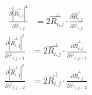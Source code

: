 \documentclass{article}
\renewcommand{\ij}{_{i,j}}
\newcommand{\ijj}{_{i,j-1}}
\newcommand{\ijjj}{_{i,j-2}}
\newcommand{\magn}[1]{\left\vert #1 \right\vert }
\renewcommand{\part}[2]{\frac{\partial #1 }{\partial #2}}
\newcommand{\partbig}[2]{\frac{\partial }{\partial #2}\left( #1 \right)}
\newcommand{\harp}{\overset{\rightharpoonup}}
\newcommand{\rij}{\harp r \ij}
\newcommand{\Rij}{\harp R \ij}
\newcommand{\rijj}{\harp r \ijj}
\newcommand{\rijjj}{\harp r \ijjj}
\begin{document}
\begin{align*}
  \part{
    \magn{\Rij^\perp}^2
  }{ \rij }
  &= 
  2 \Rij^\perp \cdot \part{\Rij^\perp}{\rij}
\end{align*}
\begin{align*}
  \part{
    \magn{\Rij^\perp}^2
  }{ \rijj }
  &= 
  2 \Rij^\perp \cdot \part{\Rij^\perp}{\rijj}
\end{align*}
\begin{align*}
  \part{
    \magn{\Rij^\perp}^2
  }{ \rijjj }
  &= 
  2 \Rij^\perp \cdot \part{\Rij^\perp}{\rijjj}
\end{align*}



\end{document}
